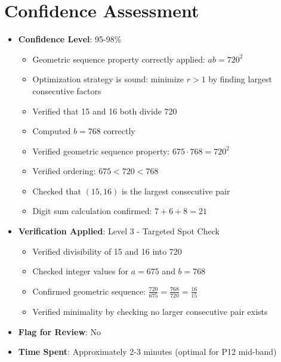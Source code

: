 \documentclass[11pt]{article}
\begin{document}
\section*{Confidence Assessment}
\begin{itemize}[leftmargin=*]
    \item \textbf{Confidence Level}: 95-98\%
    \begin{itemize}
        \item Geometric sequence property correctly applied: $ab = 720^2$
        \item Optimization strategy is sound: minimize $r > 1$ by finding largest consecutive factors
        \item Verified that 15 and 16 both divide 720
        \item Computed $b = 768$ correctly
        \item Verified geometric sequence property: $675 \cdot 768 = 720^2$
        \item Verified ordering: $675 < 720 < 768$
        \item Checked that $(15, 16)$ is the largest consecutive pair
        \item Digit sum calculation confirmed: $7 + 6 + 8 = 21$
    \end{itemize}
    
    \item \textbf{Verification Applied}: Level 3 - Targeted Spot Check
    \begin{itemize}
        \item Verified divisibility of 15 and 16 into 720
        \item Checked integer values for $a = 675$ and $b = 768$
        \item Confirmed geometric sequence: $\frac{720}{675} = \frac{768}{720} = \frac{16}{15}$
        \item Verified minimality by checking no larger consecutive pair exists
    \end{itemize}
    
    \item \textbf{Flag for Review}: No
    
    \item \textbf{Time Spent}: Approximately 2-3 minutes (optimal for P12 mid-band)
\end{itemize}
\end{document}
